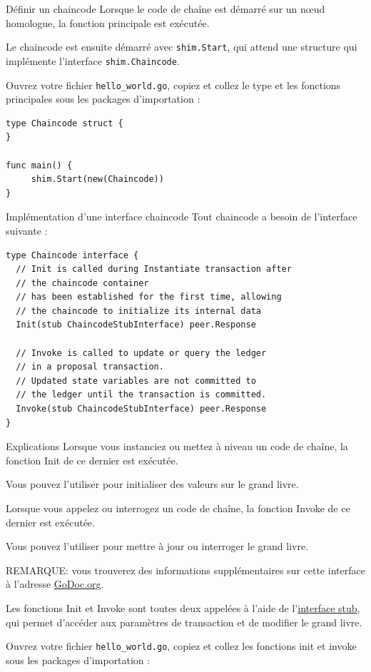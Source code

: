 \documentclass[presentation]{beamer}
\begin{document}
\begin{frame}[fragile,label={sec:org2a0e702}]{Définir un chaincode}
 Lorsque le code de chaîne est démarré sur un nœud homologue, la fonction principale est exécutée. 

Le chaincode est ensuite démarré avec \texttt{shim.Start}, qui attend une structure qui implémente l'interface \texttt{shim.Chaincode}.

Ouvrez votre fichier \texttt{hello\_world.go}, copiez et collez le type et les fonctions principales sous les packages d'importation :

\begin{verbatim}
type Chaincode struct {
}

func main() {
     shim.Start(new(Chaincode))
}
\end{verbatim}
\end{frame}
\begin{frame}[fragile,label={sec:orge4c4224}]{Implémentation d'une interface chaincode}
 Tout chaincode a besoin de l'interface suivante : 

\begin{verbatim}
type Chaincode interface {
  // Init is called during Instantiate transaction after 
  // the chaincode container
  // has been established for the first time, allowing 
  // the chaincode to initialize its internal data
  Init(stub ChaincodeStubInterface) peer.Response

  // Invoke is called to update or query the ledger 
  // in a proposal transaction.
  // Updated state variables are not committed to 
  // the ledger until the transaction is committed.
  Invoke(stub ChaincodeStubInterface) peer.Response
}
\end{verbatim}
\end{frame}
\begin{frame}[fragile,label={sec:org99aa9ad}]{Explications}
 Lorsque vous instanciez ou mettez à niveau un code de chaîne, la fonction Init de ce dernier est exécutée. 

Vous pouvez l'utiliser pour initialiser des valeurs sur le grand livre.

Lorsque vous appelez ou interrogez un code de chaîne, la fonction Invoke de ce dernier est exécutée. 

Vous pouvez l'utiliser pour mettre à jour ou interroger le grand livre.

REMARQUE: vous trouverez des informations supplémentaires sur cette interface à l'adresse \href{https://godoc.org/github.com/hyperledger/fabric/core/chaincode/shim\#Chaincode}{GoDoc.org}.

Les fonctions Init et Invoke sont toutes deux appelées à l’aide de l’\href{https://godoc.org/github.com/hyperledger/fabric/core/chaincode/shim\#ChaincodeStubInterface}{interface stub}, qui permet 
d’accéder aux paramètres de transaction et de modifier le grand livre.

Ouvrez votre fichier \texttt{hello\_world.go}, copiez et collez les fonctions init et invoke sous les packages d'importation :
\end{frame}
\end{document}
